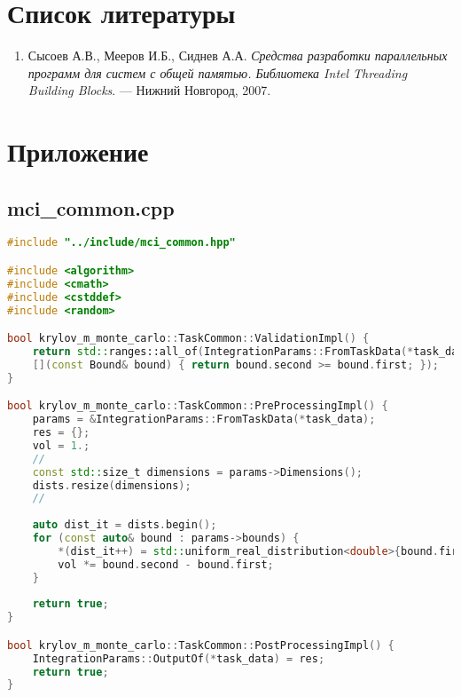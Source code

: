 \documentclass[a4paper,12pt]{article}
\begin{document}
\section{Список литературы}
\begin{enumerate}
 OpenMP Architecture Review Board. OpenMP Specifications. \\ 
\url{https://www.openmp.org/specifications/}

 Intel® oneAPI Threading Building Blocks (TBB) Documentation. \\ 
\url{https://www.intel.com/content/www/us/en/developer/tools/oneapi/onetbb}

 C++ Standard Library Reference — cppreference.com. \\ 
\url{https://en.cppreference.com/w/}

 Boost C++ Libraries. Boost.MPI Documentation. \\ 
\url{https://www.boost.org/doc/libs/release/libs/mpi/}

\item Сысоев А.В., Мееров И.Б., Сиднев А.А. \textit{Средства разработки параллельных программ для систем с общей памятью. Библиотека Intel Threading Building Blocks}. — Нижний Новгород, 2007.
\end{enumerate}

\newpage

\section{Приложение}

\subsection{mci\_common.cpp}
\begin{lstlisting}[language=C++]
#include "../include/mci_common.hpp"

#include <algorithm>
#include <cmath>
#include <cstddef>
#include <random>

bool krylov_m_monte_carlo::TaskCommon::ValidationImpl() {
	return std::ranges::all_of(IntegrationParams::FromTaskData(*task_data).bounds,
	[](const Bound& bound) { return bound.second >= bound.first; });
}

bool krylov_m_monte_carlo::TaskCommon::PreProcessingImpl() {
	params = &IntegrationParams::FromTaskData(*task_data);
	res = {};
	vol = 1.;
	//
	const std::size_t dimensions = params->Dimensions();
	dists.resize(dimensions);
	//
	
	auto dist_it = dists.begin();
	for (const auto& bound : params->bounds) {
		*(dist_it++) = std::uniform_real_distribution<double>{bound.first, bound.second};
		vol *= bound.second - bound.first;
	}
	
	return true;
}

bool krylov_m_monte_carlo::TaskCommon::PostProcessingImpl() {
	IntegrationParams::OutputOf(*task_data) = res;
	return true;
}	
\end{lstlisting}
\end{document}
